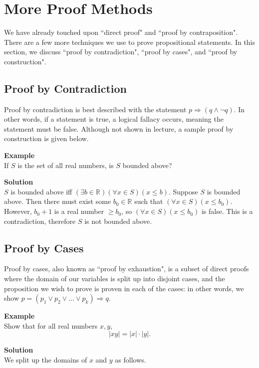 \documentclass{article}
\begin{document}
\section*{More Proof Methods}
    We have already touched upon ``direct proof" and ``proof by contraposition". There are a few more techniques we use to prove propositional statements. In this section, we discuss ``proof by contradiction", ``proof by cases", and ``proof by construction".
    
    \subsection*{Proof by Contradiction}
    Proof by contradiction is best described with the statement $p \Rightarrow (q \land \neg q)$. In other words, if a statement is true, a logical fallacy occurs, meaning the statement must be false. Although not shown in lecture, a sample proof by construction is given below.
    
    \vspace{1.5mm}
    \textbf{Example} \\
     If $S$ is the set of all real numbers, is $S$ bounded above?
    
    \vspace{1.5mm}
    \textbf{Solution} \\
        $S$ is bounded above iff $(\exists b \in \mathbb{R})(\forall x \in S)(x \le b)$. Suppose $S$ is bounded above. Then there must exist some $b_0 \in \mathbb{R}$ such that $(\forall x \in S)(x \le b_0)$. However, $b_0 + 1$ is a real number $\ge b_0$, so $(\forall x \in S)(x \le b_0)$ is false. This is a contradiction, therefore $S$ is not bounded above.

    \subsection*{Proof by Cases}
    Proof by cases, also known as ``proof by exhaustion", is a subset of direct proofs where the domain of our variables is split up into disjoint cases, and the proposition we wish to prove is proven in each of the cases: in other words, we show $p = (p_{1} \lor p_{2} \lor \dots \lor p_{k}) \Rightarrow q$.

    \vspace{1.5mm}
    \textbf{Example} \\
    Show that for all real numbers $x, y$, $$|xy| = |x| \cdot |y|.$$
    
    \vspace{1.5mm}
    \textbf{Solution} \\
    We split up the domains of $x$ and $y$ as follows.
    
\end{document}
